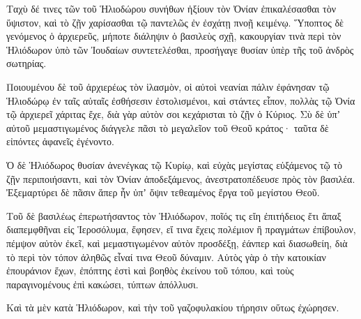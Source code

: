 {\par }{\PP {}Ταχὺ δέ τινες τῶν τοῦ Ἡλιοδώρου συνήθων ἠξίουν τὸν Ὀνίαν ἐπικαλέσασθαι τὸν ὕψιστον, καὶ τὸ ζῇν χαρίσασθαι τῷ παντελῶς ἐν ἐσχάτῃ πνοῇ κειμένῳ.
Ὕποπτος δὲ γενόμενος ὁ ἀρχιερεῦς, μήποτε διάληψιν ὁ βασιλεὺς σχῇ, κακουργίαν τινὰ περὶ τὸν Ἡλιόδωρον ὑπὸ τῶν Ἰουδαίων συντετελέσθαι, προσήγαγε θυσίαν ὑπὲρ τῆς τοῦ ἀνδρὸς σωτηρίας.
\par }{\PP {}Ποιουμένου δὲ τοῦ ἀρχιερέως τὸν ἱλασμὸν, οἱ αὐτοὶ νεανίαι πάλιν ἐφάνησαν τῷ Ἡλιοδώρῳ ἐν ταῖς αὐταῖς ἐσθήσεσιν ἐστολισμένοι, καὶ στάντες εἶπον, πολλὰς τῷ Ὀνία τῷ ἀρχιερεῖ χάριτας ἔχε, διὰ γὰρ αὐτὸν σοι κεχάρισται τὸ ζῇν ὁ Κύριος.
Σὺ δὲ ὑπʼ αὐτοῦ μεμαστιγωμένος διάγγελε πᾶσι τὸ μεγαλεῖον τοῦ Θεοῦ κράτος· ταῦτα δὲ εἰπόντες ἀφανεῖς ἐγένοντο.
\par }{\PP {}Ὁ δὲ Ἡλιόδωρος θυσίαν ἀνενέγκας τῷ Κυρίῳ, καὶ εὐχὰς μεγίστας εὐξάμενος τῷ τὸ ζῇν περιποιήσαντι, καὶ τὸν Ὀνίαν ἀποδεξάμενος, ἀνεστρατοπέδευσε πρὸς τὸν βασιλέα.
Ἐξεμαρτύρει δὲ πᾶσιν ἅπερ ἦν ὑπʼ ὄψιν τεθεαμένος ἔργα τοῦ μεγίστου Θεοῦ.
\par }{\PP {}Τοῦ δὲ βασιλέως ἐπερωτήσαντος τὸν Ἡλιόδωρον, ποῖός τις εἴη ἐπιτήδειος ἔτι ἅπαξ διαπεμφθῆναι εἰς Ἱεροσόλυμα, ἔφησεν,
εἴ τινα ἔχεις πολέμιον ἢ πραγμάτων ἐπίβουλον, πέμψον αὐτὸν ἐκεῖ, καὶ μεμαστιγωμένον αὐτὸν προσδέξῃ, ἐάνπερ καὶ διασωθείη, διὰ τὸ περὶ τὸν τόπον ἀληθῶς εἶναί τινα Θεοῦ δύναμιν.
Αὐτὸς γὰρ ὁ τὴν κατοικίαν ἐπουράνιον ἔχων, ἐπόπτης ἐστὶ καὶ βοηθὸς ἐκείνου τοῦ τόπου, καὶ τοὺς παραγινομένους ἐπὶ κακώσει, τύπτων ἀπόλλυσι.
\par }{\PP {}Καὶ τὰ μὲν κατὰ Ἡλιόδωρον, καὶ τὴν τοῦ γαζοφυλακίου τήρησιν οὕτως ἐχώρησεν.

}
